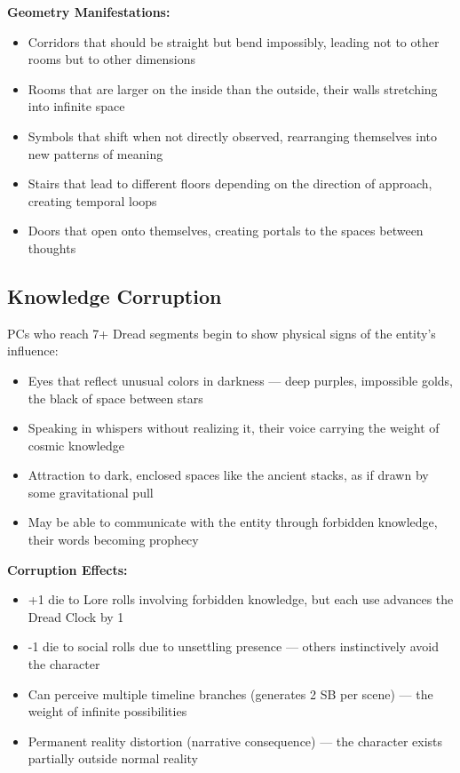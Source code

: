 \documentclass[11pt]{article}
\begin{document}
\textbf{Geometry Manifestations:}
\begin{itemize}
\item Corridors that should be straight but bend impossibly, leading not to other rooms but to other dimensions
\item Rooms that are larger on the inside than the outside, their walls stretching into infinite space
\item Symbols that shift when not directly observed, rearranging themselves into new patterns of meaning
\item Stairs that lead to different floors depending on the direction of approach, creating temporal loops
\item Doors that open onto themselves, creating portals to the spaces between thoughts
\end{itemize}

\subsection{Knowledge Corruption}

PCs who reach 7+ Dread segments begin to show physical signs of the entity's influence:
\begin{itemize}
\item Eyes that reflect unusual colors in darkness — deep purples, impossible golds, the black of space between stars
\item Speaking in whispers without realizing it, their voice carrying the weight of cosmic knowledge
\item Attraction to dark, enclosed spaces like the ancient stacks, as if drawn by some gravitational pull
\item May be able to communicate with the entity through forbidden knowledge, their words becoming prophecy
\end{itemize}

\textbf{Corruption Effects:}
\begin{itemize}
\item +1 die to Lore rolls involving forbidden knowledge, but each use advances the Dread Clock by 1
\item -1 die to social rolls due to unsettling presence — others instinctively avoid the character
\item Can perceive multiple timeline branches (generates 2 SB per scene) — the weight of infinite possibilities
\item Permanent reality distortion (narrative consequence) — the character exists partially outside normal reality
\end{itemize}
\end{document}

